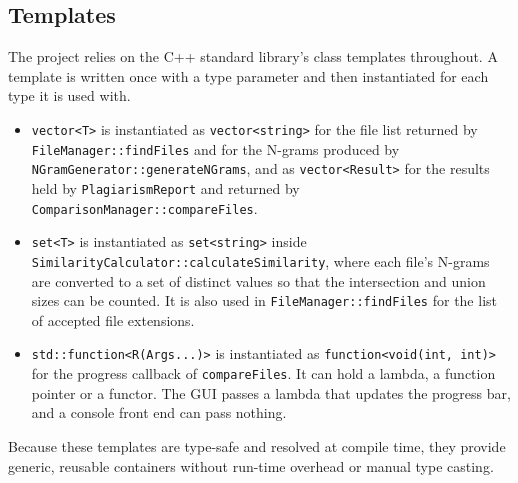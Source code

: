 \documentclass[11pt,a4paper]{report}
\newcommand{\cc}[1]{\texttt{#1}}
\begin{document}
\subsection{Templates}
The project relies on the C++ standard library's class templates throughout. A template is
written once with a type parameter and then instantiated for each type it is used with.
\begin{itemize}[nosep]
  \item \cc{vector<T>} is instantiated as \cc{vector<string>} for the file list returned by
        \cc{FileManager::findFiles} and for the N-grams produced by
        \cc{NGramGenerator::generateNGrams}, and as \cc{vector<Result>} for the results
        held by \cc{PlagiarismReport} and returned by \cc{ComparisonManager::compareFiles}.
  \item \cc{set<T>} is instantiated as \cc{set<string>} inside
        \cc{SimilarityCalculator::calculateSimilarity}, where each file's N-grams are
        converted to a set of distinct values so that the intersection and union sizes can
        be counted. It is also used in \cc{FileManager::findFiles} for the list of accepted
        file extensions.
  \item \cc{std::function<R(Args...)>} is instantiated as \cc{function<void(int, int)>} for
        the progress callback of \cc{compareFiles}. It can hold a lambda, a function pointer
        or a functor. The GUI passes a lambda that updates the progress bar, and a console
        front end can pass nothing.
\end{itemize}
Because these templates are type-safe and resolved at compile time, they provide generic,
reusable containers without run-time overhead or manual type casting.
\end{document}
